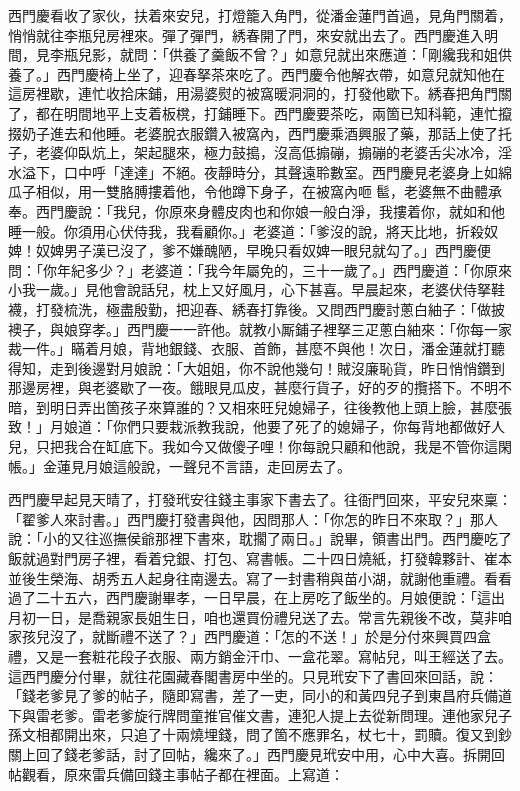西門慶看收了家伙，扶着來安兒，打燈籠入角門，從潘金蓮門首過，見角門關着，悄悄就往李瓶兒房裡來。彈了彈門，{}綉春開了門，來安就出去了。西門慶進入明間，見李瓶兒影，就問：「供養了羹飯不曾？」如意兒就出來應道：「剛纔我和姐供養了。」西門慶椅上坐了，迎春拏茶來吃了。西門慶令他解衣帶，如意兒就知他在這房裡歇，連忙收拾床鋪，用湯婆熨的被窩暖洞洞的，打發他歇下。綉春把角門關了，都在明間地平上支着板櫈，打鋪睡下。西門慶要茶吃，兩箇已知科範，連忙攛掇奶子進去和他睡。老婆脫衣服鑽入被窩內，西門慶乘酒興服了藥，那話上使了托子，老婆仰臥炕上，架起腿來，極力鼓搗，沒高低搧磞，搧磞的老婆舌尖冰冷，淫水溢下，口中呼「達達」不絕。夜靜時分，其聲遠聆數室。{}西門慶見老婆身上如綿瓜子相似，用一雙胳膊摟着他，令他蹲下身子，在被窩內咂𩫻䯲，老婆無不曲體承奉。西門慶說：「我兒，你原來身體皮肉也和你娘一般白淨，我摟着你，就如和他睡一般。{}你須用心伏侍我，我看顧你。」老婆道：「爹沒的說，將天比地，折殺奴婢！奴婢男子漢已沒了，爹不嫌醜陋，早晚只看奴婢一眼兒就勾了。」西門慶便問：「你年紀多少？」老婆道：「我今年屬免的，三十一歲了。」西門慶道：「你原來小我一歲。」見他會說話兒，枕上又好風月，心下甚喜。早晨起來，老婆伏侍拏鞋襪，打發梳洗，極盡殷勤，把迎春、綉春打靠後。又問西門慶討蔥白紬子：「做披襖子，與娘穿孝。」西門慶一一許他。就教小厮鋪子裡拏三疋蔥白紬來：「你每一家裁一件。」瞞着月娘，背地銀錢、衣服、首飾，甚麼不與他！次日，潘金蓮就打聽得知，走到後邊對月娘說：「大姐姐，你不說他幾句！賊沒廉恥貨，昨日悄悄鑽到那邊房裡，與老婆歇了一夜。餓眼見瓜皮，甚麼行貨子，好的歹的攬搭下。不明不暗，到明日弄出箇孩子來算誰的？又相來旺兒媳婦子，往後教他上頭上臉，甚麼張致！」月娘道：「你們只要栽派教我說，他要了死了的媳婦子，你每背地都做好人兒，只把我合在缸底下。我如今又做傻子哩！你每說只顧和他說，我是不管你這閑帳。」金蓮見月娘這般說，一聲兒不言語，走回房去了。

西門慶早起見天晴了，打發玳安往錢主事家下書去了。往衙門回來，平安兒來稟：「翟爹人來討書。」西門慶打發書與他，因問那人：「你怎的昨日不來取？」那人說：「小的又往巡撫侯爺那裡下書來，{}耽擱了兩日。」說畢，領書出門。西門慶吃了飯就過對門房子裡，看着兌銀、打包、寫書帳。二十四日燒紙，打發韓夥計、崔本並後生榮海、胡秀五人起身往南邊去。寫了一封書稍與苗小湖，就謝他重禮。看看過了二十五六，西門慶謝畢孝，一日早晨，在上房吃了飯坐的。月娘便說：「這出月初一日，是喬親家長姐生日，咱也還買份禮兒送了去。常言先親後不改，莫非咱家孩兒沒了，就斷禮不送了？」西門慶道：「怎的不送！」於是分付來興買四盒禮，又是一套粧花段子衣服、兩方銷金汗巾、一盒花翠。寫帖兒，叫王經送了去。這西門慶分付畢，就往花園藏春閣書房中坐的。只見玳安下了書回來回話，說：「錢老爹見了爹的帖子，隨即寫書，差了一吏，同小的和黃四兒子到東昌府兵備道下與雷老爹。雷老爹旋行牌問童推官催文書，連犯人提上去從新問理。連他家兒子孫文相都開出來，只追了十兩燒埋錢，問了箇不應罪名，杖七十，罰贖。復又到鈔關上回了錢老爹話，討了回帖，纔來了。」西門慶見玳安中用，心中大喜。拆開回帖觀看，原來雷兵備回錢主事帖子都在裡面。上寫道：


